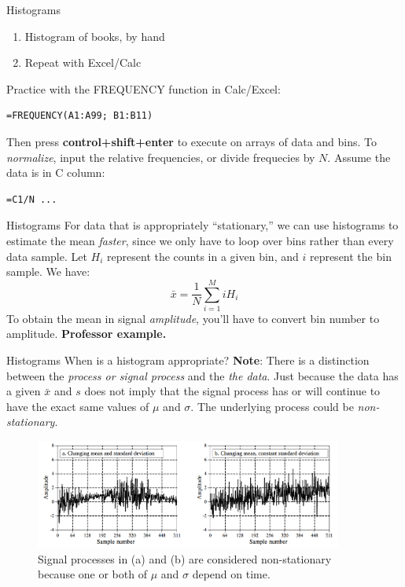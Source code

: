 \documentclass{beamer}
\begin{document}
\begin{frame}[fragile]{Histograms}
\begin{enumerate}
\item Histogram of books, by hand
\item Repeat with Excel/Calc
\end{enumerate}
Practice with the FREQUENCY function in Calc/Excel:
\begin{verbatim}
=FREQUENCY(A1:A99; B1:B11)
\end{verbatim}
Then press \alert{\textbf{control+shift+enter}} to execute on arrays of data and bins.  To \textit{normalize}, input the relative frequencies, or divide frequecies by $N$.  Assume the data is in C column:
\begin{verbatim}
=C1/N ...
\end{verbatim}
\end{frame}

\begin{frame}[fragile]{Histograms}
\small
For data that is appropriately ``stationary,'' we can use histograms to estimate the mean \textit{faster}, since we only have to loop over bins rather than every data sample.  Let $H_i$ represent the counts in a given bin, and $i$ represent the bin sample.  We have:
\begin{equation}
\bar{x} = \frac{1}{N}\sum_{i=1}^{M}i H_i 
\end{equation}
To obtain the mean in signal \textit{amplitude}, you'll have to convert bin number to amplitude.  \textbf{Professor example.}
\end{frame}

\begin{frame}[fragile]{Histograms}
\small
When is a histogram appropriate?
\textbf{Note}: There is a distinction between the \textit{process or signal process} and the \textit{the data}.  Just because the data has a given $\bar{x}$ and $s$ does not imply that the signal process has or will continue to have the exact same values of $\mu$ and $\sigma$.  The underlying process could be \textit{non-stationary}.
\begin{figure}
\centering
\includegraphics[width=0.9\textwidth]{figures/non_stationary.png}
\caption{\label{fig:non_stationary} Signal processes in (a) and (b) are considered \alert{non-stationary} because one or both of $\mu$ and $\sigma$ depend on time.}
\end{figure}
\end{frame}
\end{document}
